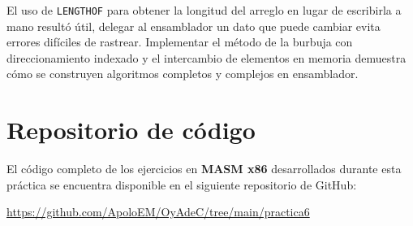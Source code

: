 \documentclass[a4paper,12pt]{article}
\begin{document}
El uso de \texttt{LENGTHOF} para obtener la longitud del arreglo en lugar de escribirla a mano resultó útil, delegar al ensamblador un dato que puede cambiar evita errores difíciles de rastrear. Implementar el método de la burbuja con direccionamiento indexado y el intercambio de elementos en memoria demuestra cómo se construyen algoritmos completos y complejos en ensamblador.

\nocite{*}
\printbibliography[title={Referencias}]

\appendix
\section{Repositorio de código}
El código completo de los ejercicios en \textbf{MASM x86} desarrollados durante esta práctica se encuentra disponible en el siguiente repositorio de GitHub:

\begin{center}
\url{https://github.com/ApoloEM/OyAdeC/tree/main/practica6}
\end{center}
\end{document}
